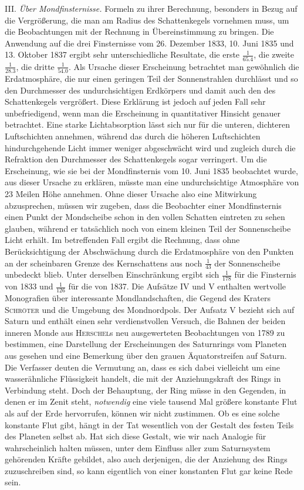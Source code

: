 III. \emph{Über Mondfinsternisse.} Formeln zu ihrer Berechnung, besonders in Bezug auf die Vergrößerung, die man am Radius des Schattenkegels vornehmen muss, um die Beobachtungen mit der Rechnung in Übereinstimmung zu bringen. Die Anwendung auf die drei Finsternisse vom 26. Dezember 1833, 10. Juni 1835 und 13. Oktober 1837 ergibt sehr unterschiedliche Resultate, die erste $\frac{1}{65.4}$, die zweite $\frac{1}{28.3}$, die dritte $\frac{1}{54.0}$. Als Ursache dieser Erscheinung betrachtet man gewöhnlich die Erdatmosphäre, die nur einen geringen Teil der Sonnenstrahlen durchlässt und so den Durchmesser des undurchsichtigen Erdkörpers und damit auch den des Schattenkegels vergrößert. Diese Erklärung ist jedoch auf jeden Fall sehr unbefriedigend, wenn man die Erscheinung in quantitativer Hinsicht genauer betrachtet. Eine starke Lichtabsorption lässt sich nur für die unteren, dichteren Luftschichten annehmen, während das durch die höheren Luftschichten hindurchgehende Licht immer weniger abgeschwächt wird und zugleich durch die Refraktion den Durchmesser des Schattenkegels sogar verringert. Um die Erscheinung, wie sie bei der Mondfinsternis vom 10. Juni 1835 beobachtet wurde, aus dieser Ursache zu erklären, müsste man eine undurchsichtige Atmosphäre von 23 Meilen Höhe annehmen. Ohne dieser Ursache also eine Mitwirkung abzusprechen, müssen wir zugeben, dass die Beobachter einer Mondfinsternis einen Punkt der Mondscheibe schon in den vollen Schatten eintreten zu sehen glauben, während er tatsächlich noch von einem kleinen Teil der Sonnenscheibe Licht erhält. Im betreffenden Fall ergibt die Rechnung, dass ohne Berücksichtigung der Abschwächung durch die Erdatmosphäre von den Punkten an der scheinbaren Grenze des Kernschattens aus noch $\frac{1}{43}$ der Sonnenscheibe unbedeckt blieb. Unter derselben Einschränkung ergibt sich $\frac{1}{178}$ für die Finsternis von 1833 und $\frac{1}{126}$ für die von 1837.
Die Aufsätze IV und V enthalten wertvolle Monografien über interessante Mondlandschaften, die Gegend des Kraters \textsc{Schröter} und die Umgebung des Mondnordpols. Der Aufsatz V bezieht sich auf Saturn und enthält einen sehr verdienstvollen Versuch, die Bahnen der beiden inneren Monde aus \textsc{Herschel}s neu ausgewerteten Beobachtungen von 1789 zu bestimmen, eine Darstellung der Erscheinungen des Saturnrings vom Planeten aus gesehen und eine Bemerkung über den grauen Äquatorstreifen auf Saturn. Die Verfasser deuten die Vermutung an, dass es sich dabei vielleicht um eine wasserähnliche Flüssigkeit handelt, die mit der Anziehungskraft des Rings in Verbindung steht. Doch der Behauptung, der Ring müsse in den Gegenden, in denen er im Zenit steht, \emph{notwendig} eine viele tausend Mal größere konstante Flut als auf der Erde hervorrufen, können wir nicht zustimmen. Ob es eine solche konstante Flut gibt, hängt in der Tat wesentlich von der Gestalt des festen Teils des Planeten selbst ab. Hat sich diese Gestalt, wie wir nach Analogie für wahrscheinlich halten müssen, unter dem Einfluss aller zum Saturnsystem gehörenden Kräfte gebildet, also auch derjenigen, die der Anziehung des Rings zuzuschreiben sind, so kann eigentlich von einer konstanten Flut gar keine Rede sein.
